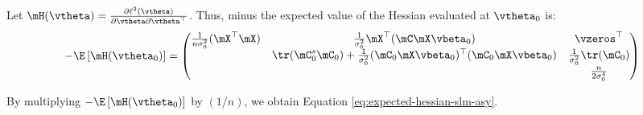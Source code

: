 \documentclass[english,12pt]{book}\usepackage[]{graphicx}\usepackage[]{xcolor}
\begin{document}
\begin{subappendices}
Let $\mH(\vtheta) = \frac{\partial \ell^2(\vtheta)}{\partial \vtheta \partial \vtheta^\top}$. Thus, minus the expected value of the Hessian evaluated at $\vtheta_0$ is:
\begin{equation}
	- \E\left[\mH(\vtheta_0)\right]= 
\begin{pmatrix}
	\frac{1}{n\sigma^2_0}(\mX^\top \mX)  & \frac{1}{\sigma^2_0} \mX^\top (\mC\mX\vbeta_0) & \vzeros^\top \\
	   & \tr(\mC^s_{0}\mC_{0}) + \frac{1}{\sigma^2_0}(\mC_{0}\mX\vbeta_0)^\top(\mC_{0}\mX\vbeta_0) &  \frac{1}{\sigma^2_0} \tr(\mC_{0}) \\
		 &  & \frac{n}{2\sigma^4_0}
	\end{pmatrix} 
\end{equation}

By multiplying $-\E\left[\mH(\vtheta_0)\right]$ by $(1/n)$, we obtain Equation \eqref{eq:expected-hessian-slm-asy}. 


% 
% 
% 
% 
% 


\end{subappendices}
\end{document}
